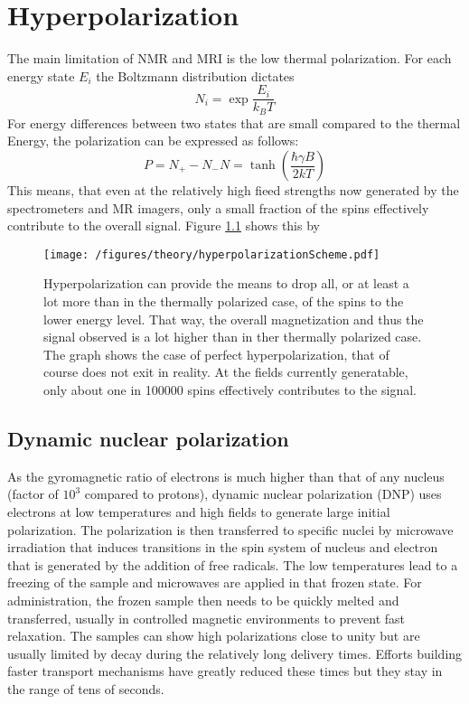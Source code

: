     \section{Hyperpolarization}
        The main limitation of NMR and MRI is the low thermal polarization.  For each energy state $E_i$ the Boltzmann distribution dictates
        \begin{equation}
            N_i = \exp{\frac{E_i}{k_B T}}
        \end{equation}
        For energy differences between two states that are small compared to the thermal Energy, the polarization can be expressed as follows:
        \begin{equation}
            P = {N_+-N_-}{N} = \tanh\left(\frac{\hbar \gamma B}{2 k T }\right)
            \label{equation:theory:polarization}
        \end{equation}
        This means, that even at the relatively high fieed strengths now generated by the spectrometers and MR imagers, only a small fraction of the spins effectively contribute to the overall signal. Figure \ref{} shows this by 
        \begin{figure}
            \texttt{[image: /figures/theory/hyperpolarizationScheme.pdf]}
            \caption[Hyperpolarization scheme]{Hyperpolarization can provide the means to drop all, or at least a lot more than in the thermally polarized case, of the spins to the lower energy level. That way, the overall magnetization and thus the signal observed is a lot higher than in ther thermally polarized case. The graph shows the case of perfect hyperpolarization, that of course does not exit in reality. At the fields currently generatable, only about one in 100000 spins effectively contributes to the signal.}
        \end{figure}
        \subsection{Dynamic nuclear polarization}
            As the gyromagnetic ratio of electrons is much higher than that of any nucleus (factor of $10^{3}$ compared to protons), dynamic nuclear polarization (DNP) uses electrons at low temperatures and high fields to generate large initial polarization. The polarization is then transferred to specific nuclei by microwave irradiation that induces transitions in the spin system of nucleus and electron that is generated by the addition of free radicals. The low temperatures lead to a freezing of the sample and microwaves are applied in that frozen state. For administration, the frozen sample then needs to be quickly melted and transferred, usually in controlled magnetic environments to prevent fast relaxation. The samples can show high polarizations close to unity but are usually limited by decay during the relatively long delivery times. Efforts building faster transport mechanisms have greatly reduced these times but they stay in the range of tens of seconds.

